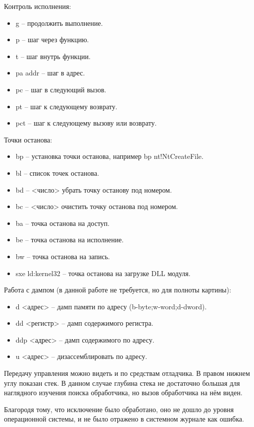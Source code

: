 \documentclass[a4paper, 12pt]{report}		%
\begin{document}
Контроль исполнения:
\begin{itemize}
\item g -- продолжить выполнение.
\item p -- шаг через функцию.
\item t -- шаг внутрь функции.
\item pa addr -- шаг в адрес.
\item pc -- шаг в следующий вызов.
\item pt -- шаг к следующему возврату.
\item pct -- шаг к следующему вызову или возврату.
\end{itemize}

Точки останова:
\begin{itemize}
\item bp -- установка точки останова, например bp nt!NtCreateFile.
\item bl -- список точек останова.
\item bd -- <число> убрать точку останову под номером.
\item bc -- <число> очистить точку останова под номером.
\item ba -- точка останова на доступ.
\item be -- точка останова на исполнение.
\item bw -- точка останова на запись.
\item sxe ld:kernel32 -- точка останова на загрузке DLL модуля.
\end{itemize}

Работа с дампом (в данной работе не требуется, но для полноты картины):
\begin{itemize}
\item d <адрес> -- дамп памяти по адресу (b-byte;w-word;d-dword).
\item dd <регистр> -- дамп содержимого регистра.
\item ddp <адрес> -- дамп содержимого по адресу.
\item u <адрес> -- дизассемблировать по адресу.
\end{itemize}

Передачу управления можно видеть и по средствам отладчика. В правом нижнем углу показан стек. В данном случае глубина стека не достаточно большая для наглядного изучения поиска обработчика, но вызов обработчика на нём виден.

Благородя тому, что исключение было обработано, оно не дошло до уровня операционной системы, и не было отражено в системном журнале как ошибка.
\end{document}
